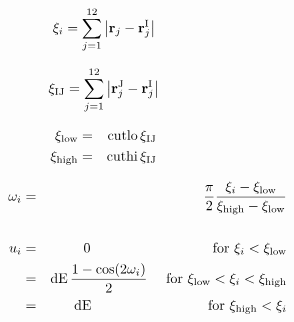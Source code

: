 \documentclass[12pt]{article}
\begin{document}
\begin{equation}
  \xi_{i} = \sum_{j=1}^{12} \left| \mathbf{r}_{j} - \mathbf{r}_{j}^{\rm I} \right|
\end{equation}

\begin{equation}
  \xi_{\rm IJ} = \sum_{j=1}^{12} \left| \mathbf{r}_{j}^{\rm J} - \mathbf{r}_{j}^{\rm I} \right|
\end{equation}

\begin{eqnarray}
  \xi_{\rm low} &=& {\rm cutlo} \, \xi_{\rm IJ}  \\
  \xi_{\rm high} &=& {\rm cuthi} \, \xi_{\rm IJ}
\end{eqnarray}

\begin{eqnarray}
  \omega_{i} &=& \frac{\pi}{2} 
       \frac{\xi_{i} - \xi_{\rm low}}{\xi_{\rm high} - \xi_{\rm low}} \\
      \mbox{\hspace*{72pt}}  \nonumber \\
  u_{i} &=& 0 \mbox{\hspace{84pt} for } \xi_{i} < \xi_{\rm low}  \nonumber \\
        &=& {\rm dE}\,\frac{1 - \cos(2 \omega_{i})}{2}
              \mbox{\hspace{10pt}  for } \xi_{\rm low} < \xi_{i} < \xi_{\rm high}  \\
        &=& {\rm dE} \mbox{\hspace{80pt} for } \xi_{\rm high} < \xi_{i}
                                                                \nonumber
\end{eqnarray}
\end{document}
